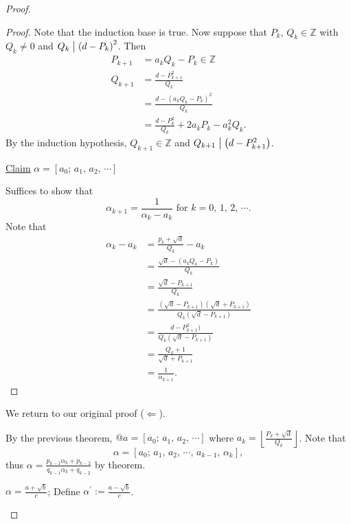 \begin{proof}
\begin{proof}
        Note that the induction base is true. Now suppose that 
        $P_k,\,Q_k \in \mathbb{Z}$ with $Q_k \neq 0$ and $Q_k \bigm| \left(d-P_k\right)^2$. Then
        \begin{align*}
            P_{k+1} &= a_kQ_k-P_k \in \mathbb{Z} \\
            Q_{k+1} &= \frac{d-P_{k+1}^2}{Q_k} \\
            &= \frac{d-\left(a_kQ_k - P_k\right)^2}{Q_k} \\
            &= \frac{d-P_k^2}{Q_k} + 2a_kP_k - a_k^2Q_k.
        \end{align*}
        By the induction hypothesis, $Q_{k+1} \in \mathbb{Z}$ and $Q_{k+1} \bigm| \left(d-P_{k+1}^2\right)$.

        \underline{Claim} $\alpha = \left[ a_0;\,a_1,\,a_2,\,\cdots \right]$

        Suffices to show that
        \[
            \alpha_{k+1}=\frac{1}{\alpha_k-a_k} \mbox{ for } k=0,\,1,\,2,\,\cdots.
        \]
        Note that
        \begin{align*}
            \alpha_k-a_k &= \frac{p_k+\sqrt{d}}{Q_k}-a_k \\
            &= \frac{\sqrt{d}-\left(a_kQ_k-P_k\right)}{Q_k} \\ 
            &= \frac{\sqrt{d}-P_{k+1}}{Q_k} \\
            &= \frac{\left( \sqrt{d}-P_{k+1} \right)\left( \sqrt{d}+P_{k+1} \right)}{Q_k\left( \sqrt{d}-P_{k+1} \right)} \\
            &= \frac{d-P_{k+1}^2)}{Q_k\left( \sqrt{d}-P_{k+1} \right)} \\
            &= \frac{Q_k+1}{\sqrt{d}+P_{k+1}} \\
            &= \frac{1}{\alpha_{k+1}}.
        \end{align*}
    \end{proof}

    We return to our original proof ($\Leftarrow$).

    By the previous theorem,
    $@a = \left[ a_0;\,a_1,\,a_2,\,\cdots \right]$ where $a_k=\left\lfloor\frac{P_k+\sqrt{d}}{Q_k}\right\rfloor$.
    Note that
    \[
        \alpha=\left[ a_0;\,a_1,\,a_2,\,\cdots,\,a_{k-1},\,\alpha_k \right],
    \]
    thus $\alpha=\frac{p_{k-1}\alpha_k+p_{k-2}}{q_{k-1}\alpha_k+q_{k-2}}$ by theorem.

    \begin{definition}
        $\alpha = \frac{a+\sqrt{b}}{c}$; Define $\alpha^\prime:=\frac{a-\sqrt{b}}{c}$.
    \end{definition}


\end{proof}

